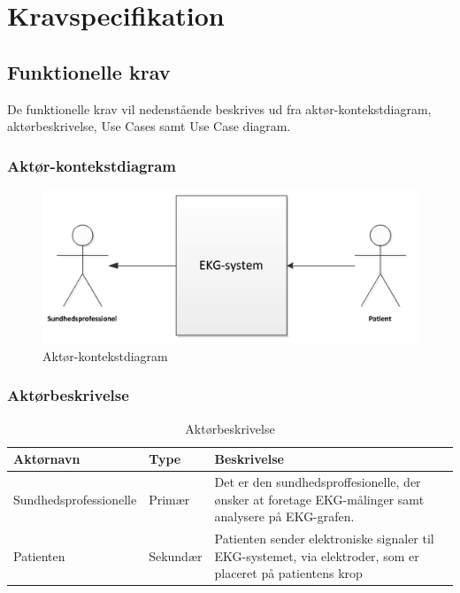 \chapter{Kravspecifikation}

\section{Funktionelle krav}
De funktionelle krav vil nedenstående beskrives ud fra aktør-kontekstdiagram, aktørbeskrivelse, Use Cases samt Use Case diagram. 

\subsection{Aktør-kontekstdiagram}

\begin{figure}[htb]
	\centering
	\includegraphics[width=1\textwidth]{Figurer/Snip20150226_1}
	\caption{Aktør-kontekstdiagram}
	\label{fig:aktoerbeskrivelse}
\end{figure}

\subsection{Aktørbeskrivelse}

\begin{table}[H]
\begin{tabularx}{\textwidth}{l l X}
    \toprule
     Aktørnavn  & Type      & Beskrivelse \\ \midrule
     Sundhedsprofessionelle   & Primær    & Det er den sundhedsproffesionelle, der ønsker at foretage EKG-målinger samt analysere på EKG-grafen.\\ 						  									  \addlinespace[2mm]
     Patienten & Sekundær  & Patienten sender elektroniske signaler til EKG-systemet, via elektroder, som er placeret på patientens krop\\                                                                                                                                                                            
   
     \bottomrule                                                                                                                   
    \end{tabularx}
    \caption {Aktørbeskrivelse}
    \label{tab:aktoerbeskrivelse}
	
\end{table}

